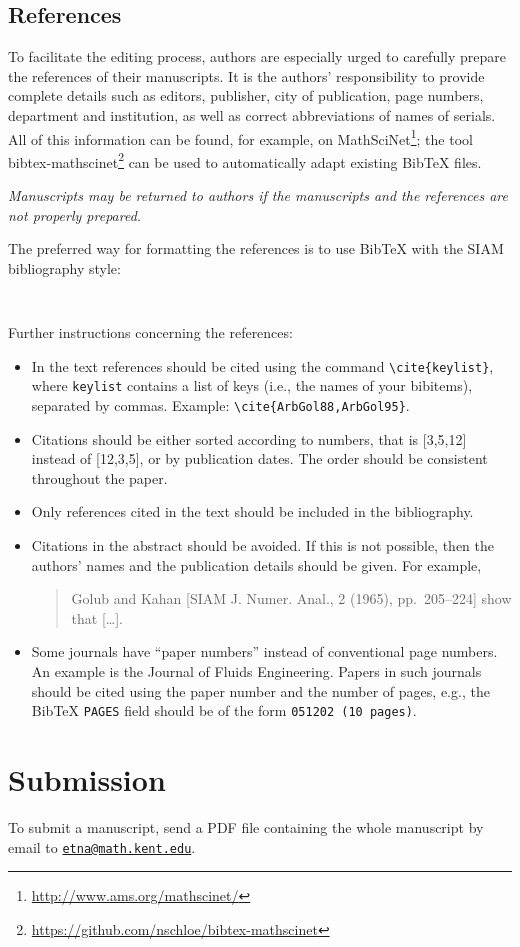 \documentclass[parskip=half]{scrartcl}
\begin{document}
\subsection{References}
To facilitate the editing process, authors are especially urged to carefully
prepare the references of their manuscripts. It is the authors' responsibility
to provide complete details such as editors, publisher, city of publication,
page numbers, department and institution, as well as correct abbreviations of
names of serials. All of this information can be found, for example, on
MathSciNet\footnote{\url{http://www.ams.org/mathscinet/}}; the tool
bibtex-mathscinet\footnote{\url{https://github.com/nschloe/bibtex-mathscinet}}
can be used to automatically adapt existing BibTeX files.

\emph{Manuscripts may be returned to authors if the manuscripts and the
references are not properly prepared.}

The preferred way for formatting the references is to use BibTeX with the SIAM
bibliography style:
\begin{verbatim}


\end{verbatim}

Further instructions concerning the references:

\begin{itemize}
\item In the text references should be cited using the command
  \verb|\cite{keylist}|, where \verb|keylist| contains a list of keys (i.e.,
  the names of your bibitems), separated by commas. Example:
  \verb|\cite{ArbGol88,ArbGol95}|.

\item Citations should be either sorted according to numbers, that is [3,5,12]
  instead of [12,3,5], or by publication dates. The order should be consistent
  throughout the paper.

\item Only references cited in the text should be included in the bibliography.

\item Citations in the abstract should be avoided. If this is not possible,
  then the authors' names and the publication details should be given. For
  example,
\begin{quote}
  Golub and Kahan [SIAM J. Numer. Anal., 2 (1965), pp.~205--224] show that
  [\dots].
\end{quote}

\item Some journals have ``paper numbers'' instead of conventional page
  numbers.  An example is the Journal of Fluids Engineering. Papers in such
  journals should be cited using the paper number and the number of pages,
  e.g., the BibTeX \texttt{PAGES} field should be of the form \texttt{051202
  (10 pages)}.

\end{itemize}

\section{Submission}
To submit a manuscript, send a PDF file containing the whole manuscript by
email to \href{mailto:etna@math.kent.edu}{\nolinkurl{etna@math.kent.edu}}.
\end{document}
